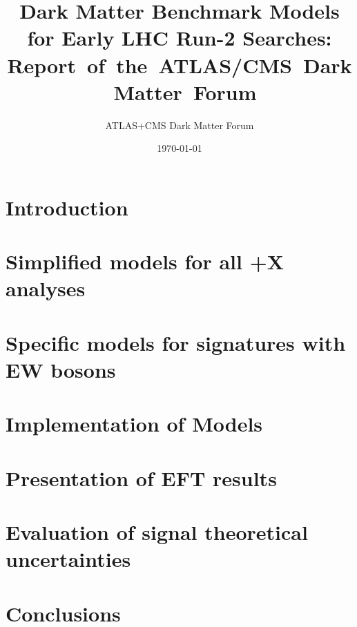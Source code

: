 \documentclass[a4paper,debug,notitlepage,nobib]{tufte-book}
\title{Dark Matter Benchmark Models for Early LHC Run-2 Searches:\\\noindent Report~of~the~ATLAS/CMS~Dark~Matter~Forum}
\author{ATLAS+CMS Dark Matter Forum}
\date{\today}
\begin{document}
\setcounter{secnumdepth}{3} %



\setcounter{tocdepth}{3}
\tableofcontents
 
\pagebreak

\chapter{Introduction}
\label{sec:Introduction}



\chapter{\texorpdfstring{Simplified models for all \MET+X analyses}{Simplified models for all MET+X analyses}}
\label{subsec:MonojetLikeModels}


\chapter{Specific models for signatures with EW bosons}
\label{subsec:EWSpecificModels}


\chapter{Implementation of Models}
\label{app:MonojetLikeModels_Appendix}


\chapter{Presentation of EFT results}
\label{sec:EFTValidity} 


\chapter{Evaluation of signal theoretical uncertainties}
\label{sec:TheoryUncertainties} 


\chapter{Conclusions}
\label{chapter:conclusions}

 

\end{document}
